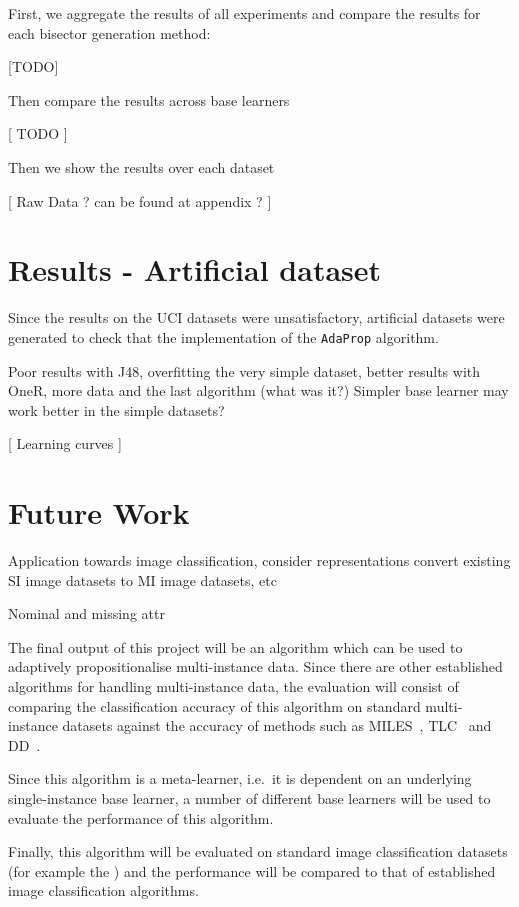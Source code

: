 \documentclass[a4paper,12pt]{article} %
\newcommand{\AdaProp}{\texttt{AdaProp}\xspace}
\begin{document}
First, we aggregate the results of all experiments and 
    compare the results for each bisector generation method:
    
[TODO]

Then compare the results across base learners 

[ TODO ]

Then we show the results over each dataset

[ Raw Data ? can be found at appendix ? ]    
    


\section{Results - Artificial dataset}
Since the results on the UCI datasets were unsatisfactory, 
    artificial datasets were generated to check that the 
    implementation of the \AdaProp algorithm.
    
Poor results with J48, overfitting the very simple dataset, better results with 
    OneR, more data and the last algorithm (what was it?)
Simpler base learner may work better in the simple datasets?

[ Learning curves ]


\section{Future Work}
Application towards image classification, consider representations
    convert existing SI image datasets to MI image datasets, etc

Nominal and missing attr

The final output of this project will be an algorithm which can be used to adaptively propositionalise multi-instance data. Since there are other established algorithms for handling multi-instance data, the evaluation will consist of comparing the classification accuracy of this algorithm on standard multi-instance datasets against the accuracy of methods such as MILES~\cite{Chen2006}, TLC~\cite{Weidmann2003} and DD~\cite{Maron98mil}.

Since this algorithm is a meta-learner, i.e.\ it is dependent on an underlying single-instance base learner, a number of different base learners will be used to evaluate the performance of this algorithm.
 
Finally, this algorithm will be evaluated on standard image classification datasets (for example the ) and the performance will be compared to that of established image classification algorithms.
\end{document}
